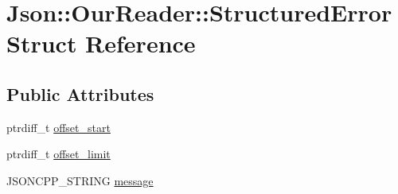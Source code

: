 \hypertarget{structJson_1_1OurReader_1_1StructuredError}{\section{Json\-:\-:Our\-Reader\-:\-:Structured\-Error Struct Reference}
\label{structJson_1_1OurReader_1_1StructuredError}
}
\subsection*{Public Attributes}
\begin{DoxyCompactItemize}
\item 
ptrdiff\-\_\-t \hyperlink{structJson_1_1OurReader_1_1StructuredError_a102677698afb8177c985e72dafe72b15}{offset\-\_\-start}
\item 
ptrdiff\-\_\-t \hyperlink{structJson_1_1OurReader_1_1StructuredError_a15491a751a39c5153af04e68b1d0abb9}{offset\-\_\-limit}
\item 
J\-S\-O\-N\-C\-P\-P\-\_\-\-S\-T\-R\-I\-N\-G \hyperlink{structJson_1_1OurReader_1_1StructuredError_a9d0b9986bf765d067dfcf2f971a450d1}{message}
\end{DoxyCompactItemize}


